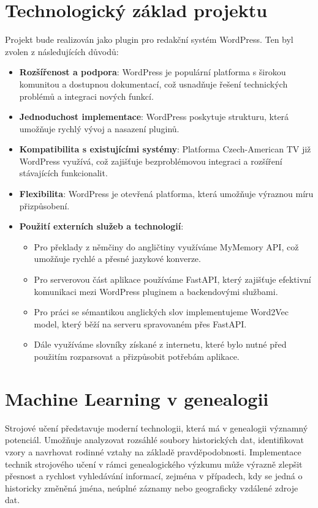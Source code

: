 \documentclass[czech, ba, kiv, he]{fasthesis}
\begin{document}
\section{Technologický základ projektu}

Projekt bude realizován jako plugin pro redakční systém WordPress. Ten byl zvolen z následujících důvodů:

\begin{itemize}
\item \textbf{Rozšířenost a podpora}: WordPress je populární platforma s širokou komunitou a dostupnou dokumentací, což usnadňuje řešení technických problémů a integraci nových funkcí.
\item \textbf{Jednoduchost implementace}: WordPress poskytuje strukturu, která umožňuje rychlý vývoj a nasazení pluginů.
\item \textbf{Kompatibilita s existujícími systémy}: Platforma Czech-American TV již WordPress využívá, což zajišťuje bezproblémovou integraci a rozšíření stávajících funkcionalit.
\item \textbf{Flexibilita}: WordPress je otevřená platforma, která umožňuje výraznou míru přizpůsobení.
\item \textbf{Použití externích služeb a technologií}:
\begin{itemize}
\item Pro překlady z němčiny do angličtiny využíváme MyMemory API, což umožňuje rychlé a přesné jazykové konverze.
\item Pro serverovou část aplikace používáme FastAPI, který zajišťuje efektivní komunikaci mezi WordPress pluginem a backendovými službami.
\item Pro práci se sémantikou anglických slov implementujeme Word2Vec model, který běží na serveru spravovaném přes FastAPI.
\item Dále využíváme slovníky získané z internetu, které bylo nutné před použitím rozparsovat a přizpůsobit potřebám aplikace.
\end{itemize}
\end{itemize}

\section{Machine Learning v genealogii}  

Strojové učení představuje moderní technologii, která má v genealogii významný potenciál. Umožňuje analyzovat rozsáhlé soubory historických dat, identifikovat vzory a navrhovat rodinné vztahy na základě pravděpodobnosti. Implementace technik strojového učení v rámci genealogického výzkumu může výrazně zlepšit přesnost a rychlost vyhledávání informací, zejména v případech, kdy se jedná o historicky změněná jména, neúplné záznamy nebo geograficky vzdálené zdroje dat.  
\end{document}

